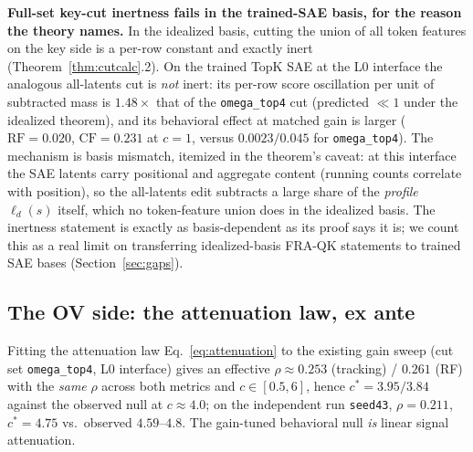 \documentclass{article}
\begin{document}
\textbf{Full-set key-cut inertness fails in the trained-SAE basis, for the reason the theory names.} In the idealized basis, cutting the union of all token features on the key side is a per-row constant and exactly inert (Theorem~\ref{thm:cutcalc}.2). On the trained TopK SAE at the L0 interface the analogous all-latents cut is \emph{not} inert: its per-row score oscillation per unit of subtracted mass is $1.48\times$ that of the \texttt{omega\_top4} cut (predicted $\ll 1$ under the idealized theorem), and its behavioral effect at matched gain is larger ($\mathrm{RF} = 0.020$, $\mathrm{CF} = 0.231$ at $c = 1$, versus $0.0023/0.045$ for \texttt{omega\_top4}). The mechanism is basis mismatch, itemized in the theorem's caveat: at this interface the SAE latents carry positional and aggregate content (running counts correlate with position), so the all-latents edit subtracts a large share of the \emph{profile} $\ell_d(s)$ itself, which no token-feature union does in the idealized basis. The inertness statement is exactly as basis-dependent as its proof says it is; we count this as a real limit on transferring idealized-basis FRA-QK statements to trained SAE bases (Section~\ref{sec:gaps}).

\subsection{The OV side: the attenuation law, ex ante}

Fitting the attenuation law Eq.~\eqref{eq:attenuation} to the existing gain sweep (cut set \texttt{omega\_top4}, L0 interface) gives an effective $\rho \approx 0.253$ (tracking) / $0.261$ (RF) with the \emph{same} $\rho$ across both metrics and $c \in [0.5, 6]$, hence $c^* = 3.95/3.84$ against the observed null at $c \approx 4.0$; on the independent run \texttt{seed43}, $\rho = 0.211$, $c^* = 4.75$ vs.\ observed $4.59$--$4.8$. The gain-tuned behavioral null \emph{is} linear signal attenuation.
\end{document}
